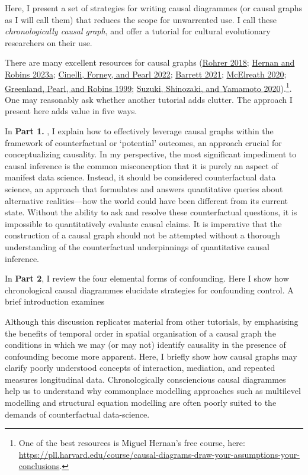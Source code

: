\documentclass[
  singlecolumn]{report}
\begin{document}
Here, I present a set of strategies for writing causal diagrammes (or
causal graphs as I will call them) that reduces the scope for
unwarrented use. I call these \emph{chronologically causal graph}, and
offer a tutorial for cultural evolutionary researchers on their use.

There are many excellent resources for causal graphs
(\protect\hyperlink{ref-rohrer2018}{Rohrer 2018};
\protect\hyperlink{ref-hernan2023}{Hernan and Robins 2023a};
\protect\hyperlink{ref-cinelli2022}{Cinelli, Forney, and Pearl 2022};
\protect\hyperlink{ref-barrett2021}{Barrett 2021};
\protect\hyperlink{ref-mcelreath2020}{McElreath 2020};
\protect\hyperlink{ref-greenland1999}{Greenland, Pearl, and Robins
1999}; \protect\hyperlink{ref-suzuki2020}{Suzuki, Shinozaki, and
Yamamoto 2020}).\footnote{One of the best resources is Miguel Hernan's
  free course, here:
  \url{https://pll.harvard.edu/course/causal-diagrams-draw-your-assumptions-your-conclusions}.}.
One may reasonably ask whether another tutorial adds clutter. The
approach I present here adds value in five ways.

In \textbf{Part 1.} , I explain how to effectively leverage causal
graphs within the framework of counterfactual or `potential' outcomes,
an approach crucial for conceptualizing causality. In my perspective,
the most significant impediment to causal inference is the common
misconception that it is purely an aspect of manifest data science.
Instead, it should be considered counterfactual data science, an
approach that formulates and answers quantitative queries about
alternative realities---how the world could have been different from its
current state. Without the ability to ask and resolve these
counterfactual questions, it is impossible to quantitatively evaluate
causal claims. It is imperative that the construction of a causal graph
should not be attempted without a thorough understanding of the
counterfactual underpinnings of quantitative causal inference.

In \textbf{Part 2}, I review the four elemental forms of confounding.
Here I show how chronological causal diagrammes elucidate strategies for
confounding control. A brief introduction examines

Although this discussion replicates material from other tutorials, by
emphasising the benefits of temporal order in spatial organisation of a
causal graph the conditions in which we may (or may not) identify
causality in the presence of confounding become more apparent. Here, I
briefly show how causal graphs may clarify poorly understood concepts of
interaction, mediation, and repeated measures longitudinal data.
Chronologically consciencious causal diagrammes help us to understand
why commonplace modelling approaches such as multilevel modelling and
structural equation modelling are often poorly suited to the demands of
counterfactual data-science.
\end{document}
